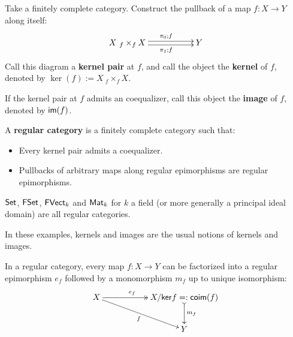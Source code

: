 \begin{definition}
Take a finitely complete category.  Construct the pullback of a map $f:X\to Y$ along itself:
 $$\xymatrix{X\ {}_f \times_f X  \ar@<-.5ex>[rr]_{\ \ \pi_1;f}  \ar@<.5ex>[rr]^{\ \ \pi_0;f}&& Y}$$
Call this diagram a {\bf kernel pair} at $f$, and call the object  the {\bf kernel} of $f$, denoted by $\ker(f):=X\ {}_f \times_f X$.

If the kernel pair at $f$ admits an coequalizer, call this object the {\bf image} of $f$, denoted by $\mathsf{im}(f)$.

A {\bf regular category} is a finitely complete category such that:
\begin{itemize}
\item Every kernel pair admits a coequalizer.

\item Pullbacks of arbitrary maps along regular epimorphisms are regular epimorphisms.
\end{itemize}

\end{definition}



\begin{example}
$\mathsf{Set}$, $\mathsf{FSet}$, $\mathsf{FVect}_k$ and  $\mathsf{Mat}_k$ for $k$ a field (or more generally a principal ideal domain) are all regular categories.

In these examples, kernels and images are the usual notions of kernels and images.
\end{example}


\begin{lemma}
In a regular category, every map $f:X\to Y$ can be factorized into a regular epimorphism $e_f$ followed by a monomorphism $m_f$ up to unique isomorphism:
$$
\xymatrix{
X \ar@{->>}[rr]^{\hspace*{-.7cm}e_f} \ar[drr]_{f} &&{X/\ker{f}=:\co\im(f)} \ar@{>->}[d]^{m_f}\\
                                        &&Y
}
$$
\end{lemma}


